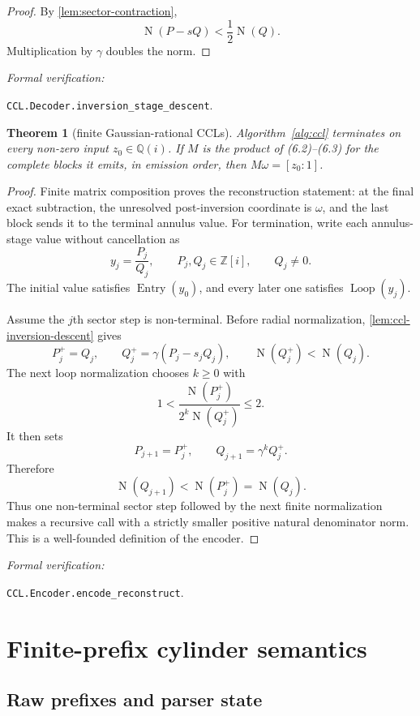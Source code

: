 \documentclass[10pt]{article}
\newtheorem{theorem}{Theorem}[section]
\theoremstyle{definition}
\theoremstyle{remark}
\newcommand{\Qi}{\mathbb{Q}(i)}
\newcommand{\Zi}{\mathbb{Z}[i]}
\newcommand{\Norm}{\operatorname{N}}
\newcommand{\leanref}[1]{\par\smallskip\noindent
  \emph{Formal verification:}\par\nobreak
  {\raggedright\nolinkurl{#1}.\par}}
\newcommand{\Proj}[2]{[#1:#2]}
\begin{document}
\begin{proof}
By \autoref{lem:sector-contraction},
\[
 \Norm(P-sQ)<\frac12\Norm(Q).
\]
Multiplication by $\gamma$ doubles the norm.
\end{proof}

\leanref{CCL.Decoder.inversion_stage_descent}

\begin{theorem}[finite Gaussian-rational CCLs]\label{thm:ccl-finite}
Algorithm~\ref{alg:ccl} terminates on every non-zero input $z_0\in\Qi$.  If $M$ is the product of (6.2)--(6.3) for the complete blocks it emits, in emission order, then $M\omega=\Proj{z_0}{1}$.
\end{theorem}

\begin{proof}
Finite matrix composition proves the reconstruction statement: at the final exact subtraction, the unresolved post-inversion coordinate is $\omega$, and the last block sends it to the terminal annulus value.  For termination, write each annulus-stage value without cancellation as
\[
 y_j=\frac{P_j}{Q_j},\qquad P_j,Q_j\in\Zi,
 \qquad Q_j\ne0.
\]
The initial value satisfies $\operatorname{Entry}(y_0)$, and every later one satisfies $\operatorname{Loop}(y_j)$.

Assume the $j$th sector step is non-terminal.  Before radial normalization, \autoref{lem:ccl-inversion-descent} gives
\[
 P_j^+=Q_j,
 \qquad
 Q_j^+=\gamma(P_j-s_jQ_j),
 \qquad
 \Norm(Q_j^+)<\Norm(Q_j).
\]
The next loop normalization chooses $k\ge0$ with
\[
 1<\frac{\Norm(P_j^+)}{2^k\Norm(Q_j^+)}\le2.
\]
It then sets
\[
 P_{j+1}=P_j^+,
 \qquad
 Q_{j+1}=\gamma^kQ_j^+.
\]
Therefore
\[
 \Norm(Q_{j+1})<\Norm(P_j^+)=\Norm(Q_j).
\]
Thus one non-terminal sector step followed by the next finite normalization makes a recursive call with a strictly smaller positive natural denominator norm.  This is a well-founded definition of the encoder.
\end{proof}

\leanref{CCL.Encoder.encode_reconstruct}

\section{Finite-prefix cylinder semantics}

\subsection{Raw prefixes and parser state}
\end{document}
